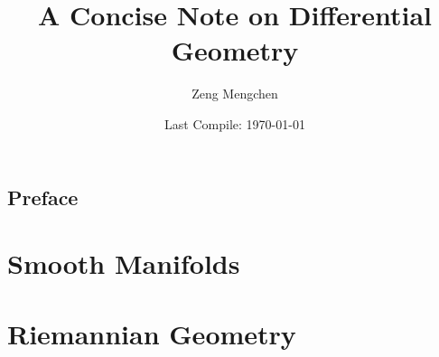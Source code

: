 \documentclass[]{book}
\title{A Concise Note on Differential Geometry}
\author{Zeng Mengchen}
\date{Last Compile: \today}
\theoremstyle{definition}
\theoremstyle{plain}
\theoremstyle{remark}
\begin{document}
\maketitle

\frontmatter

\chapter{Preface}

\mainmatter

\part{Smooth Manifolds}

\part{Riemannian Geometry}


\backmatter


\end{document}
